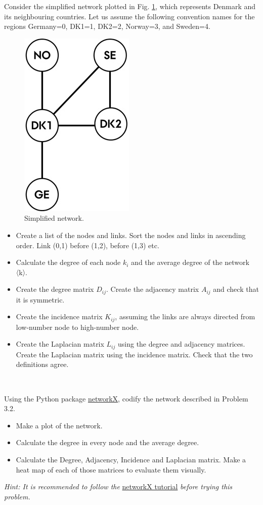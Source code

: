 \documentclass[10pt]{article}
\newenvironment{problem}[2][Problem]{\begin{trivlist}
\item[\hskip \labelsep {\bfseries #1}\hskip \labelsep {\bfseries #2.}]}{\end{trivlist}}
\begin{document}
\begin{problem}{3.2}

Consider the simplified network plotted in Fig. \ref{fig_network}, which represents Denmark and its neighbouring countries. Let us assume the following convention names for the regions Germany=0, DK1=1, DK2=2, Norway=3, and Sweden=4.
\begin{figure}
    \centering
    \includegraphics[width=0.2\linewidth]{figures/nodes.jpg}
    \caption{Simplified network.}
    \label{fig_network}
\end{figure}
\begin{itemize}
\item[a)] Create a list of the nodes and links. Sort the nodes and links in ascending order. Link (0,1) before (1,2), before (1,3) etc.
\item[b)] Calculate the degree of each node $k_i$  and the average degree of the network 〈k〉. 
\item[c)] Create the degree matrix $D_{ij}$. Create the adjacency matrix $A_{ij}$ and check that it is symmetric. 
\item[d)] Create the incidence matrix $K_{ij}$, assuming the links are always directed from low-number node to high-number node.
\item[e)] Create the Laplacian matrix $L_{ij}$  using the degree and adjacency matrices. Create the Laplacian matrix using the incidence matrix. Check that the two definitions agree. 
\end{itemize}

\end{problem}

\

\begin{problem}{3.3}
Using the Python package \href{https://networkx.org/}{networkX}, codify the network described in Problem 3.2. 

\begin{itemize}
\item[a)] Make a plot of the network.
\item[b)] Calculate the degree in every node and the average degree.
\item[c)] Calculate the Degree, Adjacency, Incidence and Laplacian matrix. Make a heat map of each of those matrices to evaluate them visually.

\end{itemize}

\textit{Hint: It is recommended to follow the} \href{https://martavp.github.io/integrated-energy-grids/intro-networkx.html#}{networkX tutorial} \textit{before trying this problem.}
\end{problem}
\end{document}
